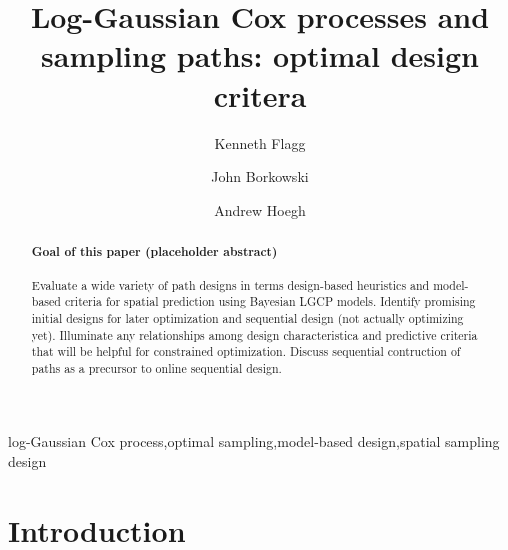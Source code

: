 \documentclass[review]{elsarticle}
\begin{document}
\begin{frontmatter}

\title{Log-Gaussian Cox processes and sampling paths: optimal design critera}

\author[msuaddr]{Kenneth Flagg}

\author[msuaddr]{John Borkowski}
\author[msuaddr]{Andrew Hoegh}

\address[msuaddr]{Department of Mathematical Sciences, Montana State University, Bozeman, MT 59717}

\begin{abstract}

\paragraph{Goal of this paper (placeholder abstract)} Evaluate a wide variety
of path designs in terms design-based heuristics and model-based criteria for
spatial prediction using Bayesian LGCP models. Identify promising initial
designs for later optimization and sequential design (not actually optimizing
yet). Illuminate any relationships among design characteristica and
predictive criteria that will be helpful for constrained optimization. Discuss
sequential contruction of paths as a precursor to online sequential design.

\end{abstract}

\begin{keyword}
log-Gaussian Cox process\sep optimal sampling\sep model-based design\sep spatial sampling design
\end{keyword}

\end{frontmatter}

\linenumbers



\section{Introduction}
\end{document}
